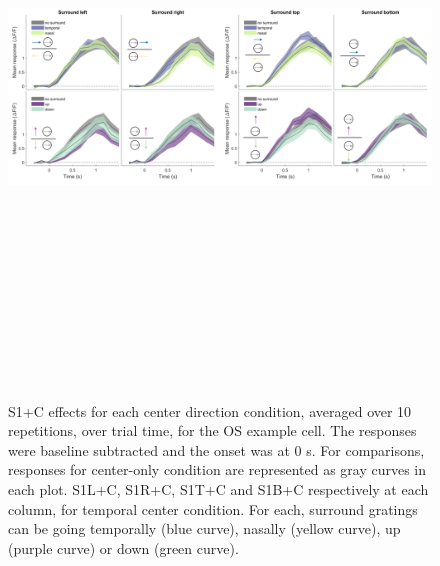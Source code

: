 \begin{figure}[H] \centering \includegraphics[width=15.9cm,height=15.9cm,keepaspectratio]{Figures/7.Results/individualSM/roi_46_mf379_pos2/3.png} 
\caption{S1+C effects for each center direction condition, averaged over 10 repetitions, over trial time, for the OS example cell. The responses were baseline subtracted and the onset was at 0 s. For comparisons, responses for center-only condition are represented as gray curves in each plot.
S1L+C, S1R+C, S1T+C and S1B+C respectively at each column, for temporal center condition. For each, surround gratings can be going temporally (blue curve), nasally (yellow curve), up (purple curve) or down (green curve).}
\label{OSexamplecellSM}
\end{figure}

